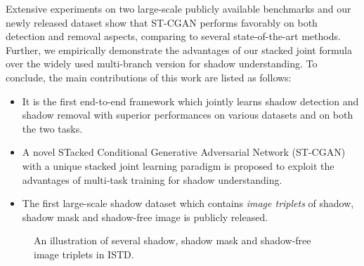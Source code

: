 \documentclass[10pt,twocolumn,letterpaper]{article}
\begin{document}
Extensive experiments on two large-scale publicly available benchmarks and our newly released dataset show that ST-CGAN performs favorably on both detection and removal aspects, comparing to several state-of-the-art methods. Further, we empirically demonstrate the advantages of our stacked joint formula over the widely used multi-branch version for shadow understanding. To conclude, the main contributions of this work are listed as follows:
\begin{itemize}
	\item It is the first end-to-end framework which jointly learns shadow detection and shadow removal with superior performances on various datasets and on both the two tasks.
	\item A novel STacked Conditional Generative Adversarial Network (ST-CGAN) with a unique stacked joint learning paradigm is proposed to exploit the advantages of multi-task training for shadow understanding.
	\item The first large-scale shadow dataset which contains \emph{image triplets} of shadow, shadow mask and shadow-free image is publicly released.
\end{itemize}


\begin{figure*}[t]
	\setlength{\abovecaptionskip}{1.cm}
	\setlength{\belowcaptionskip}{-1.cm}
	
	\begin{center}
		\setlength{\fboxrule}{0pt}
	\end{center}
	\vspace{-10pt}
	\caption{An illustration of several shadow, shadow mask and shadow-free image triplets in ISTD. }
	\label{fig_dataset_cropped}
	\vspace{-12pt}
\end{figure*}
\end{document}
